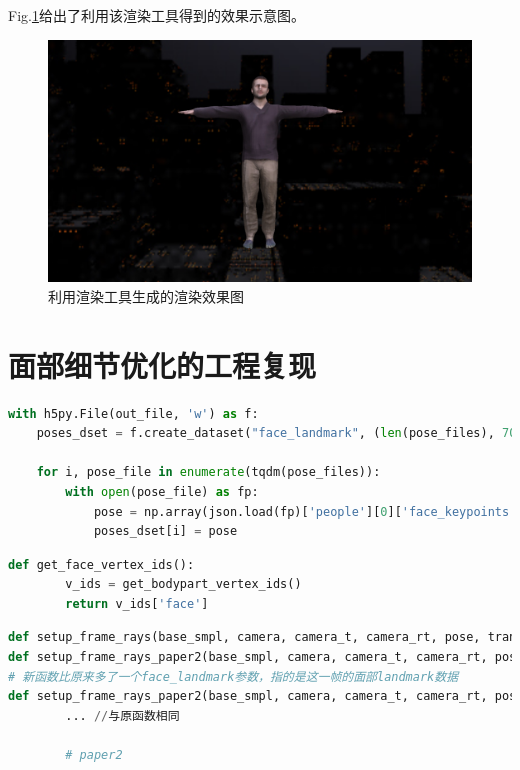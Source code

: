 \documentclass{article}
\begin{document}
\begin{appendices}
Fig.\ref{rendering1}给出了利用该渲染工具得到的效果示意图。
\begin{figure}
	\centering
	\includegraphics[width=14cm]{figure/rendering1}
	\caption{利用渲染工具生成的渲染效果图}
	\label{rendering1}
\end{figure}

\section{面部细节优化的工程复现}
\begin{lstlisting}[language=python, title=face2hdf5.py]
with h5py.File(out_file, 'w') as f:
    poses_dset = f.create_dataset("face_landmark", (len(pose_files), 70*3), 'f', chunks=True, compression="lzf")
    
    for i, pose_file in enumerate(tqdm(pose_files)):
        with open(pose_file) as fp:
            pose = np.array(json.load(fp)['people'][0]['face_keypoints'])
            poses_dset[i] = pose
\end{lstlisting}
\begin{lstlisting}[language=python, title=bodypart.py]
def get_face_vertex_ids():
        v_ids = get_bodypart_vertex_ids()
        return v_ids['face']
\end{lstlisting}  
\begin{lstlisting}[language=python, title=frame.py]
def setup_frame_rays(base_smpl, camera, camera_t, camera_rt, pose, trans, mask)
def setup_frame_rays_paper2(base_smpl, camera, camera_t, camera_rt, pose, trans, mask, face_landmark)
# 新函数比原来多了一个face_landmark参数，指的是这一帧的面部landmark数据
def setup_frame_rays_paper2(base_smpl, camera, camera_t, camera_rt, pose, trans, mask, face_landmark):
        ... //与原函数相同
        
        # paper2
    

\end{lstlisting}
\end{appendices}
\end{document}
